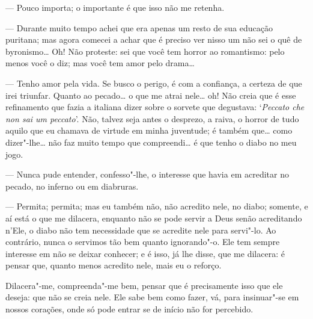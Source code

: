 --- Pouco importa; o importante é que isso não me retenha.

--- Durante muito tempo achei que era apenas um resto de sua educação
puritana; mas agora comecei a achar que é preciso ver nisso um não sei o
quê de byronismo\ldots{} Oh! Não proteste: sei que você tem horror ao
romantismo: pelo menos você o diz; mas você tem amor pelo drama\ldots{}

--- Tenho amor pela vida. Se busco o perigo, é com a confiança, a certeza
de que irei triunfar. Quanto ao pecado\ldots{} o que me atrai nele\ldots{} oh!
Não creia que é esse refinamento que fazia a italiana dizer sobre o
sorvete que degustava: `\emph{Peccato che non sai um peccato}'. Não,
talvez seja antes o desprezo, a raiva, o horror de tudo aquilo que eu
chamava de virtude em minha juventude; é também que\ldots{} como dizer"-lhe\ldots{} não faz muito tempo que compreendi\ldots{} é que tenho o diabo no meu
jogo.

--- Nunca pude entender, confesso"-lhe, o interesse que havia em acreditar
no pecado, no inferno ou em diabruras.

--- Permita; permita; mas eu também não, não acredito nele, no diabo;
somente, e aí está o que me dilacera, enquanto não se pode servir a Deus
senão acreditando n'Ele, o diabo não tem necessidade que se acredite
nele para servi"-lo. Ao contrário, nunca o servimos tão bem quanto
ignorando"-o. Ele tem sempre interesse em não se deixar conhecer; e é
isso, já lhe disse, que me dilacera: é pensar que, quanto menos acredito
nele, mais eu o reforço.

Dilacera"-me, compreenda"-me bem, pensar que é precisamente isso que ele
deseja: que não se creia nele. Ele sabe bem como fazer, vá, para
insinuar"-se em nossos corações, onde só pode entrar se de início não for
percebido.

